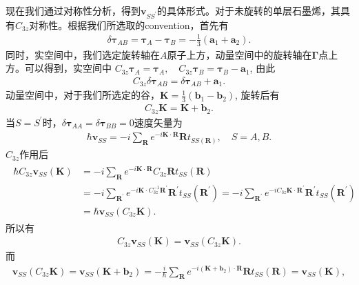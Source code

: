 \documentclass[10pt, oneside]{article}
\begin{document}
现在我们通过对称性分析，得到\(\bm{v }_{SS^{\prime}}\)的具体形式。对于未旋转的单层石墨烯，其具有\(C_{3z}\)对称性。根据我们所选取的convention，首先有
\begin{align}
	\delta \bm{\tau}_{AB} = \bm{\tau}_{A} - \bm{\tau}_{B} = - \frac{1}{3} \left(\bm{a }_{1} + \bm{a }_{2}\right).
\end{align}
同时，实空间中，我们选定旋转轴在\(A\)原子上方，动量空间中的旋转轴在\(\bm{\Gamma }\)点上方。可以得到，实空间中 \(C_{3z} \bm{\tau}_{A } = \bm{\tau}_{A },\quad C_{3z} \bm{\tau}_{B} = \bm{\tau}_{B} - \bm{a}_{1}\), 由此
\begin{align}
	C_{3z} \delta \bm{\tau}_{AB} = \delta \bm{\tau}_{AB}  + \bm{a }_{1}.
\end{align}
动量空间中，对于我们所选定的谷，\(\bm{K} = \frac{1}{3} \left(\bm{b}_{1} - \bm{b}_{2}\right)\), 旋转后有
\begin{align}
	C_{3z} \bm{K} = \bm{K} + \bm{b}_{2}.
\end{align}
当\(S = S^{\prime}\)时，\(\delta \bm{\tau}_{AA} = \delta \bm{\tau}_{BB} = 0\)速度矢量为
\begin{align}
	\hbar \bm{v }_{SS} = - i \sum_{\bm{R}} e^{-i \bm{K} \cdot \bm{R}} \bm{R} t_{SS 	 \left(\bm{R}\right)} ,\quad  S = A, B.
\end{align}
\(C_{3z}\)作用后
\begin{align}
	\begin{split}
		\hbar C_{3z}  \bm{v }_{SS} \left(\bm{K}\right) & = -i \sum_{\bm{R}} e^{-i \bm{K }\cdot\bm{R}} C_{3z} \bm{R} t_{SS } \left(\bm{R}\right)  \\
		& = -i \sum_{\bm{R}^{\prime}} e^{-i \bm{K } \cdot C_{3z}^{-1} \bm{R}^{\prime}} \bm{R}^{\prime} t_{SS} \left(\bm{R}^{\prime}\right) = -i \sum_{\bm{R}^{\prime}} e^{-i C_{3z} \bm{K } \cdot \bm{R}^{\prime}} \bm{R}^{\prime} t_{SS} \left(\bm{R}^{\prime}\right) \\
		& = \hbar  \bm{v }_{SS} \left(C_{3z} \bm{K}\right).
	\end{split}
\end{align}
所以有
\begin{align}
	C_{3z} \bm{v }_{SS} \left(\bm{K}\right) = \bm{v }_{SS} \left(C_{3z} \bm{K}\right).
\end{align}
而
\begin{align}
	\bm{v }_{SS} \left(C_{3z} \bm{K}\right) = \bm{v}_{SS} \left(\bm{K} + \bm{b}_2\right) = - \frac{i}{\hbar} \sum_{\bm{R}} e^{-i \left(\bm{K} + \bm{b}_{2}\right)\cdot \bm{R}} \bm{R} t_{SS} \left(\bm{R}\right) = \bm{v }_{SS} \left(\bm{K}\right),
\end{align}
\end{document}
